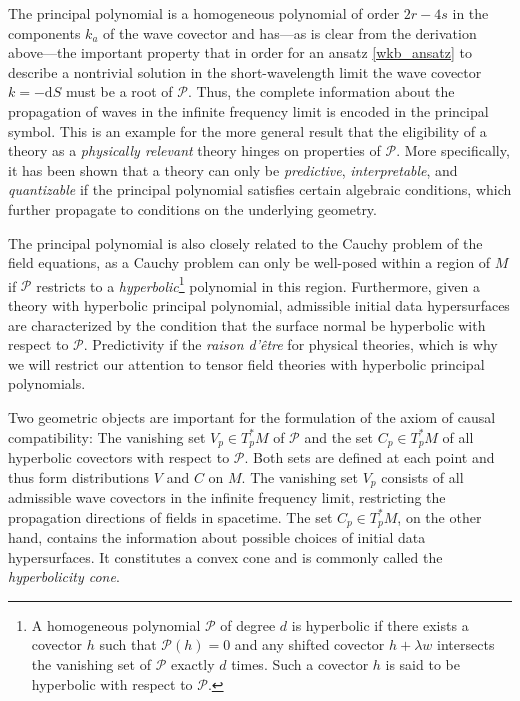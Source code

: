 The principal polynomial is a homogeneous polynomial of order $2r-4s$ in the components $k_a$ of the wave covector and has---as is clear from the derivation above---the important property that in order for an ansatz \eqref{wkb_ansatz} to describe a nontrivial solution in the short-wavelength limit the wave covector $k=-\mathrm dS$ must be a root of $\mathcal P$. Thus, the complete information about the propagation of waves in the infinite frequency limit is encoded in the principal symbol. This is an example for the more general result that the eligibility of a theory as a \emph{physically relevant} theory hinges on properties of $\mathcal P$. More specifically, it has been shown that a theory can only be \emph{predictive}, \emph{interpretable}, and \emph{quantizable} if the principal polynomial satisfies certain algebraic conditions, which further propagate to conditions on the underlying geometry.\cite{sergio}

The principal polynomial is also closely related to the Cauchy problem of the field equations, as a Cauchy problem can only be well-posed within a region of $M$ if $\mathcal P$ restricts to a \emph{hyperbolic}\footnote{A homogeneous polynomial $\mathcal P$ of degree $d$ is hyperbolic if there exists a covector $h$ such that $\mathcal P(h)=0$ and any shifted covector $h+\lambda w$ intersects the vanishing set of $\mathcal P$ exactly $d$ times. Such a covector $h$ is said to be hyperbolic with respect to $\mathcal P$.} polynomial in this region. Furthermore, given a theory with hyperbolic principal polynomial, admissible initial data hypersurfaces are characterized by the condition that the surface normal be hyperbolic with respect to $\mathcal P$.\cite{hörmander,ivrii} Predictivity if the \emph{raison d'\^etre} for physical theories, which is why we will restrict our attention to tensor field theories with hyperbolic principal polynomials.

Two geometric objects are important for the formulation of the axiom of causal compatibility: The vanishing set $V_p\in T_p^\ast M$ of $\mathcal P$ and the set $C_p\in T_p^\ast M$ of all hyperbolic covectors with respect to $\mathcal P$. Both sets are defined at each point and thus form distributions $V$ and $C$ on $M$. The vanishing set $V_p$ consists of all admissible wave covectors in the infinite frequency limit, restricting the propagation directions of fields in spacetime. The set $C_p\in T_p^\ast M$, on the other hand, contains the information about possible choices of initial data hypersurfaces. It constitutes a convex cone\cite{garding} and is commonly called the \emph{hyperbolicity cone}\cite{sergio}.

